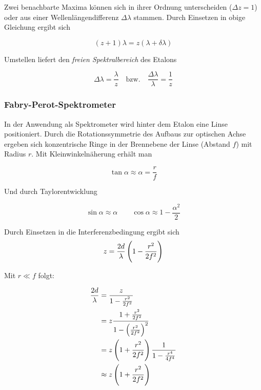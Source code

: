 \documentclass[a4paper,german,12pt,smallheadings]{scrartcl}
\begin{document}
Zwei benachbarte Maxima können sich in ihrer Ordnung unterscheiden ($\Delta z =
1$) oder aus einer Wellenlängendifferenz $\Delta \lambda$ stammen. Durch
Einsetzen in obige Gleichung ergibt sich

\begin{equation}
  (z+1) \lambda = z (\lambda + \delta \lambda)
\end{equation}

Umstellen liefert den \textit{freien Spektralbereich} des Etalons

\begin{equation}
  \Delta \lambda = \frac{\lambda}{z} \quad \text{bzw.} \quad \frac{\Delta \lambda}{\lambda} = \frac{1}{z}
\end{equation}

\subsubsection{Fabry-Perot-Spektrometer}

In der Anwendung als Spektrometer wird hinter dem Etalon eine Linse
positioniert. Durch die Rotationssymmetrie des Aufbaus zur optischen Achse
ergeben sich konzentrische Ringe in der Brennebene der Linse (Abstand $f$) mit
Radius $r$. Mit Kleinwinkelnäherung erhält man

\begin{equation}
  \tan \alpha \approx \alpha = \frac{r}{f}
\end{equation}

Und durch Taylorentwicklung

\begin{equation}
  \sin \alpha \approx \alpha \qquad \cos \alpha \approx 1 - \frac{\alpha^2}{2}
\end{equation}

Durch Einsetzen in die Interferenzbedingung ergibt sich
\begin{equation}
  z = \frac{2d}{\lambda} \del{1 - \frac{r^2}{2f^2}}
  \label{eq:ord}
\end{equation}

Mit $r \ll f$ folgt:

\begin{align*}
  \frac{2d}{\lambda} &= \frac{z}{1-\frac{r^2}{2f^2}} \\
                     &= z \frac{1+\frac{r^2}{2f^2}}{1 - \del{\frac{r^2}{2f^2}}^2} \\
                     &= z \del{1 + \frac{r^2}{2f^2}} \frac{1}{1 - \frac{r^4}{4f^4}} \\
                     &\approx z \del{1+\frac{r^2}{2f^2}}
\end{align*}
\end{document}
